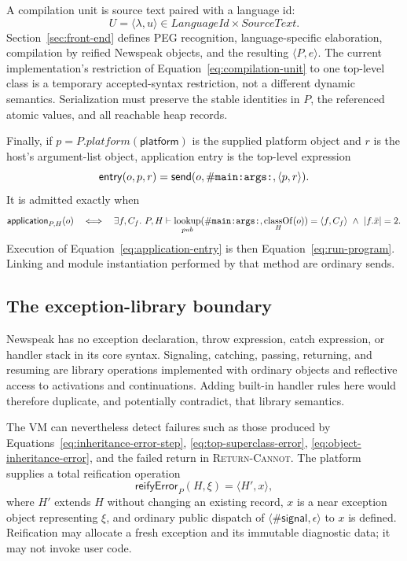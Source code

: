 \documentclass[11pt]{article}
\numberwithin{equation}{section}
\newcommand{\kw}[1]{\ensuremath{\mathsf{#1}}}
\newcommand{\classof}{\mathop{\mathrm{classOf}}}
\newcommand{\lookup}{\mathop{\mathrm{lookup}}}
\newcommand{\selsym}[1]{\ensuremath{\mathord{\#}\text{\texttt{#1}}}}
\newcommand{\rulelabel}[1]{\textsc{#1}}
\begin{document}
A compilation unit is source text paired with a language id:
\begin{equation}\label{eq:compilation-unit}
 U=\langle\lambda,u\rangle
 \in\mathit{LanguageId}\times\mathit{SourceText}.
\end{equation}
Section~\ref{sec:front-end} defines PEG recognition, language-specific
elaboration, compilation by reified Newspeak objects, and the resulting
$\langle P,e\rangle$.  The current implementation's restriction of
Equation~\eqref{eq:compilation-unit} to one top-level class is a temporary
accepted-syntax restriction, not a different dynamic semantics.  Serialization
must preserve the stable identities in $P$, the referenced atomic values, and
all reachable heap records.

Finally, if $p=P.\mathit{platform}(\kw{platform})$ is the supplied platform
object and $r$ is the host's argument-list object, application entry is the
top-level expression
\begin{equation}\label{eq:application-entry}
 \mathsf{entry}(o,p,r)=
   \kw{send}(o,\selsym{main:args:},\langle p,r\rangle).
\end{equation}
It is admitted exactly when
\begin{equation}\label{eq:application-object}
 \mathsf{application}_{P,H}(o)\quad\Longleftrightarrow\quad
 \exists f,C_f.\ P,H\vdash
 \lookup_{pub}(\selsym{main:args:},\classof_H(o))=\langle f,C_f\rangle
 \ \land\ |f.\bar x|=2.
\end{equation}
Execution of Equation~\eqref{eq:application-entry} is then
Equation~\eqref{eq:run-program}.  Linking and module instantiation performed
by that method are ordinary sends.

\subsection{The exception-library boundary}
\label{sec:exception-boundary}

Newspeak has no exception declaration, throw expression, catch expression, or
handler stack in its core syntax.  Signaling, catching, passing, returning,
and resuming are library operations implemented with ordinary objects and
reflective access to activations and continuations.  Adding built-in handler
rules here would therefore duplicate, and potentially contradict, that
library semantics.

The VM can nevertheless detect failures such as those produced by
Equations~\eqref{eq:inheritance-error-step},
\eqref{eq:top-superclass-error}, \eqref{eq:object-inheritance-error}, and the
failed return in \rulelabel{Return-Cannot}.  The platform supplies a total
reification operation
\begin{equation}\label{eq:exception-reification}
 \mathsf{reifyError}_P(H,\xi)=\langle H',x\rangle,
\end{equation}
where $H'$ extends $H$ without changing an existing record, $x$ is a near
exception object representing $\xi$, and ordinary public dispatch of
$\langle\#\kw{signal},\epsilon\rangle$ to $x$ is defined.  Reification may
allocate a fresh exception and its immutable diagnostic data; it may not
invoke user code.
\end{document}
